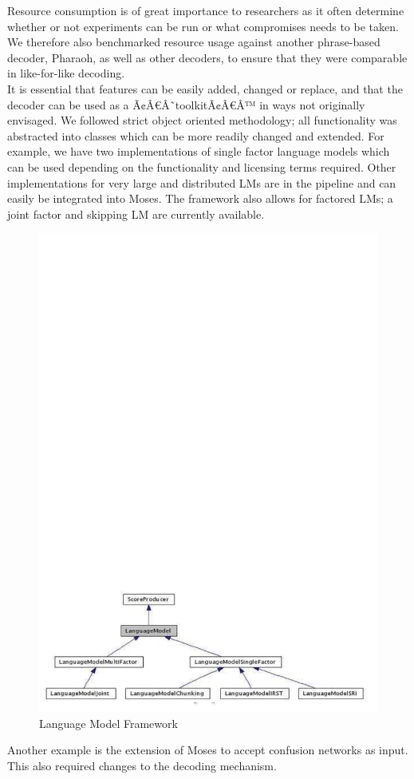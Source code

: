 \documentclass[10pt]{report}
\theoremstyle{plain}
\begin{document}
{Resource consumption is of great importance to researchers as it often determine whether or not experiments can be run or what compromises needs to be taken. We therefore also benchmarked resource usage against another phrase-based decoder, Pharaoh, as well as other decoders, to ensure that they were comparable in like-for-like decoding.\\

It is essential that features can be easily added, changed or replace, and that the decoder can be used as a Ã¢Â€Â˜toolkitÃ¢Â€Â™ in ways not originally envisaged. We followed strict object oriented methodology; all functionality was abstracted into classes which can be more readily changed and extended. For example, we have two implementations of single factor language models which can be used depending on the functionality and licensing terms required. Other implementations for very large and distributed LMs are in the pipeline and can easily be integrated into Moses. The framework also allows for factored LMs; a joint factor and skipping LM are currently available.\\
\begin{center}
\begin{figure}[h]
\centering
\includegraphics[scale=1]{hieu-2}
\caption{Language Model Framework}
\end{figure}
\end{center}
Another example is the extension of Moses to accept confusion networks as input. This also required changes to the decoding mechanism.\\

}
\end{document}
